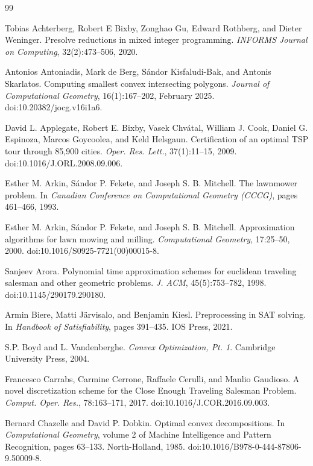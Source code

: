 \documentclass[11pt,a4paper]{article}
\theoremstyle{plain}
\begin{document}
\begin{thebibliography}{99}

 Tobias Achterberg, Robert E Bixby, Zonghao Gu, Edward Rothberg, and Dieter Weninger. Presolve reductions in mixed integer programming. \emph{INFORMS Journal on Computing}, 32(2):473--506, 2020.

 Antonios Antoniadis, Mark de Berg, Sándor Kisfaludi-Bak, and Antonis Skarlatos. Computing smallest convex intersecting polygons. \emph{Journal of Computational Geometry}, 16(1):167--202, February 2025. doi:10.20382/jocg.v16i1a6.

 David L. Applegate, Robert E. Bixby, Vasek Chvátal, William J. Cook, Daniel G. Espinoza, Marcos Goycoolea, and Keld Helsgaun. Certification of an optimal TSP tour through 85,900 cities. \emph{Oper. Res. Lett.}, 37(1):11--15, 2009. doi:10.1016/J.ORL.2008.09.006.

 Esther M. Arkin, Sándor P. Fekete, and Joseph S. B. Mitchell. The lawnmower problem. In \emph{Canadian Conference on Computational Geometry (CCCG)}, pages 461--466, 1993.

 Esther M. Arkin, Sándor P. Fekete, and Joseph S. B. Mitchell. Approximation algorithms for lawn mowing and milling. \emph{Computational Geometry}, 17:25--50, 2000. doi:10.1016/S0925-7721(00)00015-8.

 Sanjeev Arora. Polynomial time approximation schemes for euclidean traveling salesman and other geometric problems. \emph{J. ACM}, 45(5):753--782, 1998. doi:10.1145/290179.290180.

 Armin Biere, Matti Järvisalo, and Benjamin Kiesl. Preprocessing in SAT solving. In \emph{Handbook of Satisfiability}, pages 391--435. IOS Press, 2021.

 S.P. Boyd and L. Vandenberghe. \emph{Convex Optimization, Pt. 1}. Cambridge University Press, 2004.

 Francesco Carrabs, Carmine Cerrone, Raffaele Cerulli, and Manlio Gaudioso. A novel discretization scheme for the Close Enough Traveling Salesman Problem. \emph{Comput. Oper. Res.}, 78:163--171, 2017. doi:10.1016/J.COR.2016.09.003.

 Bernard Chazelle and David P. Dobkin. Optimal convex decompositions. In \emph{Computational Geometry}, volume 2 of Machine Intelligence and Pattern Recognition, pages 63--133. North-Holland, 1985. doi:10.1016/B978-0-444-87806-9.50009-8.


\end{thebibliography}
\end{document}
